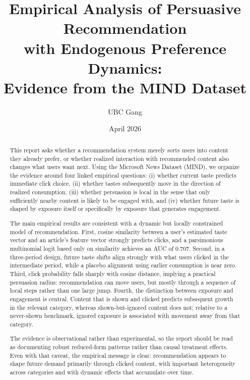 \documentclass[11pt]{article}
\title{Empirical Analysis of Persuasive Recommendation\\with Endogenous Preference Dynamics:\\[4pt] Evidence from the MIND Dataset}
\author{UBC Gang}
\date{April 2026}
\begin{document}
\maketitle

\begin{abstract}
This report asks whether a recommendation system merely sorts users into content they already prefer, or whether realized interaction with recommended content also changes what users want next. Using the Microsoft News Dataset (MIND), we organize the evidence around four linked empirical questions: (i) whether current taste predicts immediate click choice, (ii) whether tastes subsequently move in the direction of realized consumption, (iii) whether persuasion is local in the sense that only sufficiently nearby content is likely to be engaged with, and (iv) whether future taste is shaped by exposure itself or specifically by exposure that generates engagement.

The main empirical results are consistent with a dynamic but locally constrained model of recommendation. First, cosine similarity between a user's estimated taste vector and an article's feature vector strongly predicts clicks, and a parsimonious multinomial logit based only on similarity achieves an AUC of 0.707. Second, in a three-period design, future taste shifts align strongly with what users clicked in the intermediate period, while a placebo alignment using earlier consumption is near zero. Third, click probability falls sharply with cosine distance, implying a practical persuasion radius: recommendation can move users, but mostly through a sequence of local steps rather than one large jump. Fourth, the distinction between exposure and engagement is central. Content that is shown and clicked predicts subsequent growth in the relevant category, whereas shown-but-ignored content does not; relative to a never-shown benchmark, ignored exposure is associated with movement away from that category.

The evidence is observational rather than experimental, so the report should be read as documenting robust reduced-form patterns rather than causal treatment effects. Even with that caveat, the empirical message is clear: recommendation appears to shape future demand primarily through clicked content, with important heterogeneity across categories and with dynamic effects that accumulate over time.
\end{abstract}

\end{document}
